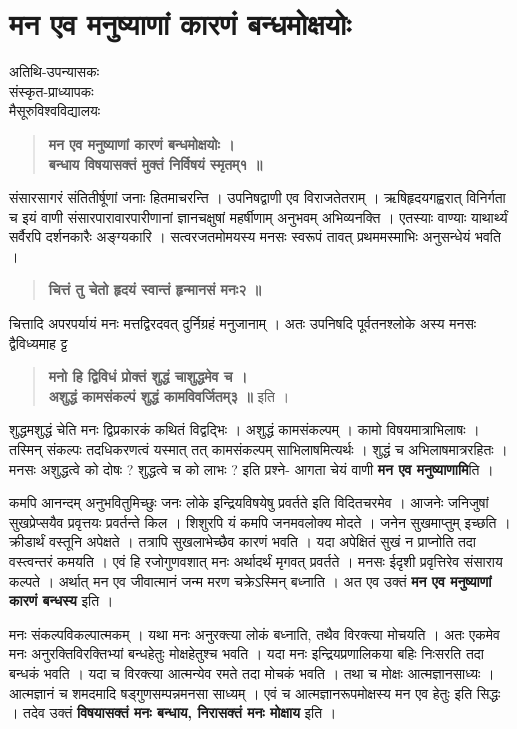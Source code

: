\chapter{मन एव मनुष्याणां कारणं बन्धमोक्षयोः }

\begin{center}
\smallskip
अतिथि-उपन्यासकः\\
संस्कृत-प्राध्यापकः\\
मैसूरुविश्वविद्यालयः
\addrule
\end{center}
\begin{verse}
\textbf{मन एव मनुष्याणां कारणं बन्धमोक्षयोः ।\\
बन्धाय विषयासक्तं मुक्तं निर्विषयं स्मृतम्१ ॥}
\end{verse}
संसारसागरं संतितीर्षूणां जनाः हितमाचरन्ति । उपनिषद्वाणी एव विराजतेतराम् । ऋषिहृदयगह्वरात् विनिर्गता च इयं वाणी संसारपारावारपारीणानां ज्ञानचक्षुषां महर्षीणाम् अनुभवम् अभिव्यनक्ति । एतस्याः वाण्याः याथार्थ्यं सर्वैरपि दर्शनकारैः अङ्ग्यकारि । सत्वरजतमोमयस्य मनसः स्वरूपं तावत् प्रथममस्माभिः अनुसन्धेयं भवति ।
\begin{verse}
\textbf{चित्तं तु चेतो हृदयं स्वान्तं हृन्मानसं मनः२ ॥}
\end{verse}
चित्तादि अपरपर्यायं मनः मत्तद्विरदवत् दुर्निग्रहं मनुजानाम् । अतः उपनिषदि पूर्वतनश्लोके अस्य मनसः द्वैविध्यमाह ट्ट 
\begin{verse}
\textbf{मनो हि द्विविधं प्रोक्तं शुद्धं चाशुद्धमेव च ।\\
अशुद्धं कामसंकल्पं शुद्धं कामविवर्जितम्३ ॥} इति ।
\end{verse}
शुद्धमशुद्धं चेति मनः द्विप्रकारकं कथितं विद्वद्भिः । अशुद्धं कामसंकल्पम् । कामो विषयमात्राभिलाषः । तस्मिन् संकल्पः तदधिकरणत्वं यस्मात् तत् कामसंकल्पम् साभिलाषमित्यर्थः । शुद्धं च अभिलाषमात्ररहितः । मनसः अशुद्धत्वे को दोषः ? शुद्धत्वे च को लाभः ? इति प्रश्ने- आगता चेयं वाणी \textbf{मन एव मनुष्याणामि}ति ।   

कमपि आनन्दम् अनुभवितुमिच्छुः जनः लोके इन्द्रियविषयेषु प्रवर्तते इति विदितचरमेव । आजनेः जनिजुषां सुखप्रेप्सयैव प्रवृत्तयः प्रवर्तन्ते किल । शिशुरपि यं कमपि जनमवलोक्य मोदते । जनेन सुखमाप्तुम् इच्छति । क्रीडार्थं वस्तूनि अपेक्षते । तत्रापि सुखलाभेच्छैव कारणं भवति । यदा अपेक्षितं सुखं न प्राप्नोति तदा वस्त्वन्तरं कमयति । एवं हि रजोगुणवशात् मनः अर्थादर्थं मृगवत् प्रवर्तते । मनसः ईदृशी प्रवृत्तिरेव संसाराय कल्पते । अर्थात् मन एव जीवात्मानं जन्म मरण चक्रेऽस्मिन् बध्नाति । अत एव उक्तं \textbf{मन एव मनुष्याणां कारणं बन्धस्य} इति । 

मनः संकल्पविकल्पात्मकम् । यथा मनः अनुरक्त्या लोकं बध्नाति, तथैव विरक्त्या मोचयति । अतः एकमेव मनः अनुरक्तिविरक्तिभ्यां बन्धहेतुः मोक्षहेतुश्च भवति । यदा मनः इन्द्रियप्रणालिकया बहिः निःसरति तदा बन्धकं भवति । यदा च विरक्त्या आत्मन्येव रमते तदा मोचकं भवति । तथा च मोक्षः आत्मज्ञानसाध्यः । आत्मज्ञानं च शमदमादि षड्गुणसम्पन्नमनसा साध्यम् । एवं च आत्मज्ञानरूपमोक्षस्य मन एव हेतुः इति सिद्धः । तदेव उक्तं \textbf{विषयासक्तं मनः बन्धाय, निरासक्तं मनः मोक्षाय} इति ।

